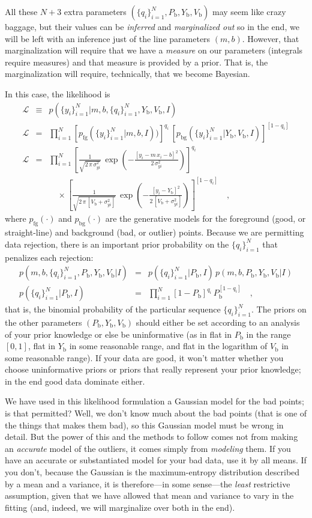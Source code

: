\documentclass[12pt,twoside]{article}
\newcommand{\setofall}[3]{\{{#1}\}_{{#2}}^{{#3}}}
\newcommand{\allq}{\setofall{q_i}{i=1}{N}}
\newcommand{\ally}{\setofall{y_i}{i=1}{N}}
\newcommand{\like}{\mathscr{L}}
\newcommand{\pfg}{p_{\mathrm{fg}}}
\newcommand{\pbg}{p_{\mathrm{bg}}}
\newcommand{\Pbad}{P_{\mathrm{b}}}
\newcommand{\Ybad}{Y_{\mathrm{b}}}
\newcommand{\Vbad}{V_{\mathrm{b}}}
\begin{document}
All these $N+3$ extra parameters $(\allq,\Pbad,\Ybad,\Vbad)$ may seem
like crazy baggage, but their values can be \emph{inferred} and
\emph{marginalized out} so in the end, we will be left with an
inference just of the line parameters $(m,b)$.  However, that
marginalization will require that we have a \emph{measure} on our
parameters (integrals require measures) and that measure is provided
by a prior.  That is, the marginalization will require, technically,
that we become Bayesian.

In this case, the likelihood is
\begin{eqnarray}\displaystyle
\like &\equiv& p(\ally|m,b,\allq,\Ybad,\Vbad,I)
 \nonumber\\
\like &=& \prod_{i=1}^N
 \left[\pfg(\ally|m,b,I))\right]^{q_i}\,
 \left[\pbg(\ally|\Ybad,\Vbad,I)\right]^{[1-q_i]}
 \nonumber\\
\like &=& \prod_{i=1}^N \left[\frac{1}{\sqrt{2\,\pi\,\sigma_{yi}^2}}
 \,\exp\left(-\frac{[y_i-m\,x_i-b]^2}{2\,\sigma_{yi}^2}\right)\right]^{q_i}
 \nonumber \\ & & \quad\times
 \left[\frac{1}{\sqrt{2\,\pi\,[\Vbad+\sigma_{yi}^2]}}
 \,\exp\left(-\frac{[y_i-\Ybad]^2}{2\,[\Vbad+\sigma_{yi}^2]}\right)\right]^{[1-q_i]}
 \quad ,
\end{eqnarray}
where $\pfg(\cdot)$ and $\pbg(\cdot)$ are the generative models for
the foreground (good, or straight-line) and background (bad, or
outlier) points.  Because we are permitting data rejection, there is
an important prior probability on the $\allq$ that penalizes each
rejection:
\begin{eqnarray}\displaystyle
p(m,b,\allq,\Pbad,\Ybad,\Vbad|I)
 &=& p(\allq|\Pbad,I)\,p(m,b,\Pbad,\Ybad,\Vbad|I)
 \nonumber\\
p(\allq|\Pbad,I)
 &=& \prod_{i=1}^N[1-\Pbad]^{q_i}\,\Pbad^{[1-q_i]}
 \quad ,
\end{eqnarray}
that is, the binomial probability of the particular sequence $\allq$.
The priors on the other parameters $(\Pbad,\Ybad,\Vbad)$ should either
be set according to an analysis of your prior knowledge or else be
uninformative (as in flat in $\Pbad$ in the range $[0,1]$, flat in
$\Ybad$ in some reasonable range, and flat in the logarithm of $\Vbad$
in some reasonable range).  If your data are good, it won't matter
whether you choose uninformative priors or priors that really
represent your prior knowledge; in the end good data dominate either.

We have used in this likelihood formulation a Gaussian model for the
bad points; is that permitted?  Well, we don't know much about the bad
points (that is one of the things that makes them bad), so this
Gaussian model must be wrong in detail.  But the power of this and the
methods to follow comes not from making an \emph{accurate} model of
the outliers, it comes simply from \emph{modeling} them.  If you have
an accurate or substantiated model for your bad data, use it by all
means.  If you don't, because the Gaussian is the maximum-entropy
distribution described by a mean and a variance, it is therefore---in
some sense---the \emph{least} restrictive assumption, given that we
have allowed that mean and variance to vary in the fitting (and,
indeed, we will marginalize over both in the end).
\end{document}
